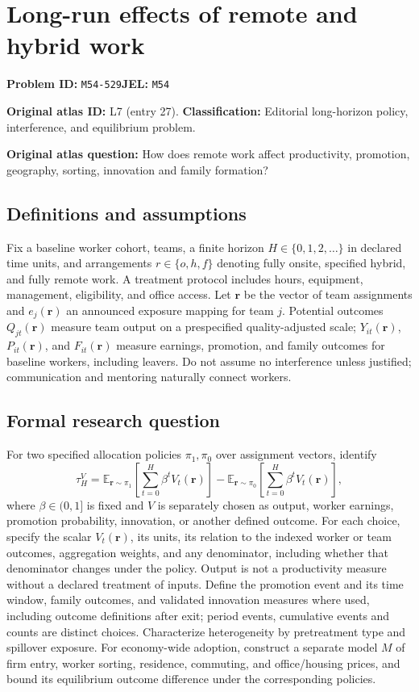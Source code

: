\documentclass[11pt,a4paper]{article}
\begin{document}
\section*{Long-run effects of remote and hybrid work}
\textbf{Problem ID:} \texttt{M54-529}\quad \textbf{JEL:} \texttt{M54}\par
\label{problem:OP-0027}
\label{atlas:prob:L7}
\noindent\textbf{Original atlas ID:} L7 (entry 27). \textbf{Classification:} Editorial long-horizon policy, interference, and equilibrium problem.

\noindent\textbf{Original atlas question:} How does remote work affect productivity, promotion, geography, sorting, innovation and family formation?

\subsection*{Definitions and assumptions}
Fix a baseline worker cohort, teams, a finite horizon $H\in\{0,1,2,\ldots\}$ in declared time units, and arrangements $r\in\{o,h,f\}$ denoting fully onsite, specified hybrid, and fully remote work. A treatment protocol includes hours, equipment, management, eligibility, and office access. Let $\mathbf r$ be the vector of team assignments and $e_j(\mathbf r)$ an announced exposure mapping for team $j$. Potential outcomes $Q_{jt}(\mathbf r)$ measure team output on a prespecified quality-adjusted scale; $Y_{it}(\mathbf r)$, $P_{it}(\mathbf r)$, and $F_{it}(\mathbf r)$ measure earnings, promotion, and family outcomes for baseline workers, including leavers. Do not assume no interference unless justified; communication and mentoring naturally connect workers.
\subsection*{Formal research question}
For two specified allocation policies $\pi_1,\pi_0$ over assignment vectors, identify
\[
 \tau_H^V=\mathbb E_{\mathbf r\sim\pi_1}
       \left[\sum_{t=0}^{H}\beta^t V_t(\mathbf r)\right]
       -\mathbb E_{\mathbf r\sim\pi_0}
       \left[\sum_{t=0}^{H}\beta^t V_t(\mathbf r)\right],
\]
where $\beta\in(0,1]$ is fixed and $V$ is separately chosen as output, worker earnings, promotion probability, innovation, or another defined outcome. For each choice, specify the scalar $V_t(\mathbf r)$, its units, its relation to the indexed worker or team outcomes, aggregation weights, and any denominator, including whether that denominator changes under the policy. Output is not a productivity measure without a declared treatment of inputs. Define the promotion event and its time window, family outcomes, and validated innovation measures where used, including outcome definitions after exit; period events, cumulative events and counts are distinct choices. Characterize heterogeneity by pretreatment type and spillover exposure. For economy-wide adoption, construct a separate model $M$ of firm entry, worker sorting, residence, commuting, and office/housing prices, and bound its equilibrium outcome difference under the corresponding policies.
\end{document}
